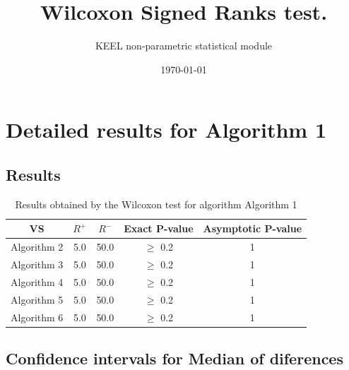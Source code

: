 \documentclass[a4paper,10pt]{article}
\title{Wilcoxon Signed Ranks test.}
\date{\today}
\author{KEEL non-parametric statistical module}
\begin{document}
\pagestyle{empty}
\maketitle
\thispagestyle{empty}



\section{Detailed results for Algorithm 1}


\subsection{Results}

\begin{table}[!htp]
\centering\small
\begin{tabular}{
|c|c|c|c|c|}
\hline
 VS & $R^{+}$ & $R^{-}$ & Exact P-value & Asymptotic P-value \\ \hline 
Algorithm 2 & 5.0 & 50.0 & $\geq$ 0.2 & 1\\ \hline 
Algorithm 3 & 5.0 & 50.0 & $\geq$ 0.2 & 1\\ \hline 
Algorithm 4 & 5.0 & 50.0 & $\geq$ 0.2 & 1\\ \hline 
Algorithm 5 & 5.0 & 50.0 & $\geq$ 0.2 & 1\\ \hline 
Algorithm 6 & 5.0 & 50.0 & $\geq$ 0.2 & 1\\ \hline 

\end{tabular}
\caption{Results obtained by the Wilcoxon test for algorithm Algorithm 1}
\end{table}

\subsection{Confidence intervals for Median of diferences}
\end{document}
